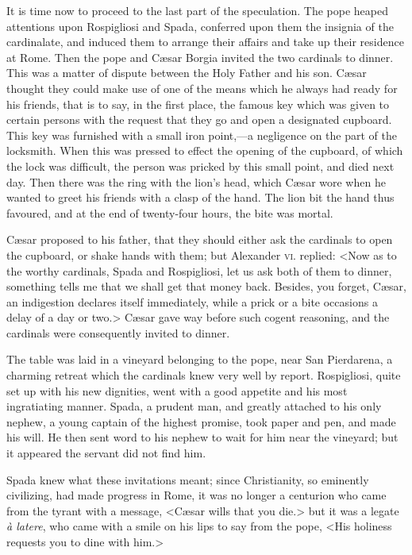 {It is time now to proceed to the last part of the speculation. The pope heaped attentions upon Rospigliosi and Spada, conferred upon them the insignia of the cardinalate, and induced them to arrange their affairs and take up their residence at Rome. Then the pope and Cæsar Borgia invited the two cardinals to dinner. This was a matter of dispute between the Holy Father and his son. Cæsar thought they could make use of one of the means which he always had ready for his friends, that is to say, in the first place, the famous key which was given to certain persons with the request that they go and open a designated cupboard. This key was furnished with a small iron point,—a negligence on the part of the locksmith. When this was pressed to effect the opening of the cupboard, of which the lock was difficult, the person was pricked by this small point, and died next day. Then there was the ring with the lion's head, which Cæsar wore when he wanted to greet his friends with a clasp of the hand. The lion bit the hand thus favoured, and at the end of twenty-four hours, the bite was mortal. 

Cæsar proposed to his father, that they should either ask the cardinals to open the cupboard, or shake hands with them; but Alexander \textsc{vi.} replied: <Now as to the worthy cardinals, Spada and Rospigliosi, let us ask both of them to dinner, something tells me that we shall get that money back. Besides, you forget, Cæsar, an indigestion declares itself immediately, while a prick or a bite occasions a delay of a day or two.> Cæsar gave way before such cogent reasoning, and the cardinals were consequently invited to dinner. 

The table was laid in a vineyard belonging to the pope, near San Pierdarena, a charming retreat which the cardinals knew very well by report. Rospigliosi, quite set up with his new dignities, went with a good appetite and his most ingratiating manner. Spada, a prudent man, and greatly attached to his only nephew, a young captain of the highest promise, took paper and pen, and made his will. He then sent word to his nephew to wait for him near the vineyard; but it appeared the servant did not find him. 

Spada knew what these invitations meant; since Christianity, so eminently civilizing, had made progress in Rome, it was no longer a centurion who came from the tyrant with a message, <Cæsar wills that you die.> but it was a legate \textit{à latere}, who came with a smile on his lips to say from the pope, <His holiness requests you to dine with him.> 

}
